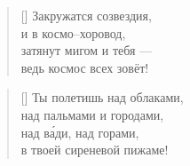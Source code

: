 \documentclass[a5paper,11pt]{memoir}
\begin{document}
\newpage
\BgThispage
\color{white}
\begin{verse}[\versewidth]
Закружатся созвездия, \\
и в космо--хоровод, \\
затянут мигом и тебя --- \\
ведь космос всех зовёт!
\end{verse}

\begin{verse}[\versewidth]
Ты полетишь над облаками, \\
над пальмами и городами, \\
над в\'{а}ди, над горами, \\
в твоей сиреневой пижаме!
\end{verse}
\end{document}

